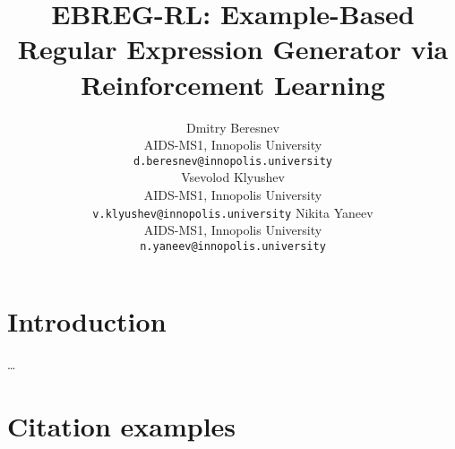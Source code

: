 \documentclass{article}
\title{EBREG-RL: Example-Based Regular Expression Generator
via Reinforcement Learning}
\date{} 					%
\author{
  \hspace{1mm}Dmitry Beresnev\\
	AIDS-MS1, Innopolis University\\
	\texttt{d.beresnev@innopolis.university}\\
	\And{}
  \hspace{1mm}Vsevolod Klyushev\\
	AIDS-MS1, Innopolis University\\
	\texttt{v.klyushev@innopolis.university}	\And{}
  \hspace{1mm}Nikita Yaneev\\
	AIDS-MS1, Innopolis University\\
	\texttt{n.yaneev@innopolis.university}
}
\begin{document}
\maketitle


\section{Introduction}

\ldots

\section{Citation examples}
\cite{Zhong2018}~\cite{Bartoli2016}~\cite{Bartoli2018}~\cite{Tariq2024}




\end{document}
